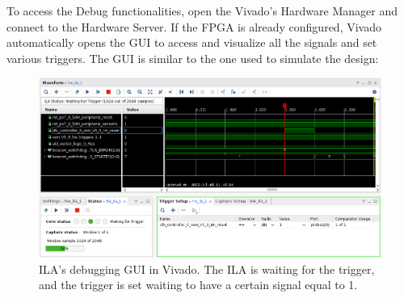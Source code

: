 To access the Debug functionalities, open the Vivado's Hardware Manager and connect to the Hardware Server. If the FPGA is already configured, Vivado automatically opens the GUI to access and visualize all the signals and set various triggers. The GUI is similar to the one used to simulate the design:

\begin{figure}[H]
\centering
\includegraphics[width=0.80\linewidth]{images/chapter3/ila_example2.png}
\caption{ILA's debugging GUI in Vivado. The ILA is waiting for the trigger, and the trigger is set waiting to have a certain signal equal to 1.}
\end{figure}
